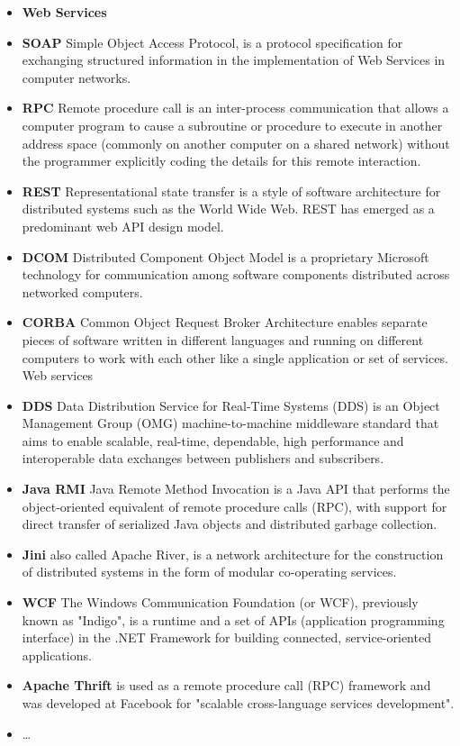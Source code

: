 \begin{itemize}
  \item \label{itm:soa_technologies} \textbf{Web Services}
  \item{\textbf{SOAP}} Simple Object Access Protocol, is a protocol specification for exchanging structured information in the implementation of Web Services in computer networks.
  \item{\textbf{RPC}} Remote procedure call is an inter-process communication that allows
  a computer program to cause a subroutine or procedure to execute in another address space (commonly on another computer on a shared network) without the programmer explicitly coding the details for this remote interaction. 
  \item{\textbf{REST}} Representational state transfer is a style of software architecture for distributed systems such as the World Wide Web. \gls{REST} has emerged as a predominant web API design model.
  \item{\textbf{DCOM}} Distributed Component Object Model is a proprietary Microsoft technology for communication among software components distributed across networked computers. 
  \item{\textbf{CORBA}}  Common Object Request Broker Architecture enables separate pieces of software written in different
    languages and running on different computers to work with each other like a single application or set of services. Web services
  \item{\textbf{DDS}} Data Distribution Service for Real-Time Systems (DDS) is an Object
  Management Group (OMG) machine-to-machine middleware standard that aims to
  enable scalable, real-time, dependable, high performance and interoperable data exchanges between publishers and subscribers. 
  \item{\textbf{Java RMI}} Java Remote Method Invocation is a Java API that performs the
  object-oriented equivalent of remote procedure calls (RPC), with support for direct transfer of serialized Java objects and distributed garbage collection.
  \item{\textbf{Jini}}  also called Apache River, is a network architecture for the construction of distributed systems in the form of modular co-operating services.
  \item{\textbf{WCF}} The Windows Communication Foundation (or WCF), previously known as
  "Indigo", is a runtime and a set of APIs (application programming interface)
  in the .NET Framework for building connected, service-oriented applications.
  \item{\textbf{Apache Thrift}} is used as a remote procedure call (RPC) framework and
  was developed at Facebook for "scalable cross-language services development".
  \item \ldots
\end{itemize}

